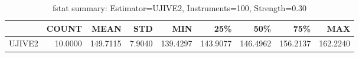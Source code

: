 \begin{table}[ht]
\centering
\caption{fstat summary: Estimator=UJIVE2, Instruments=100, Strength=0.30}
\begin{tabular}{lrrrrrrrr}
\toprule
 & COUNT & MEAN & STD & MIN & 25\% & 50\% & 75\% & MAX \\
\midrule
UJIVE2 & 10.0000 & 149.7115 & 7.9040 & 139.4297 & 143.9077 & 146.4962 & 156.2137 & 162.2240 \\
\bottomrule
\end{tabular}
\end{table}

